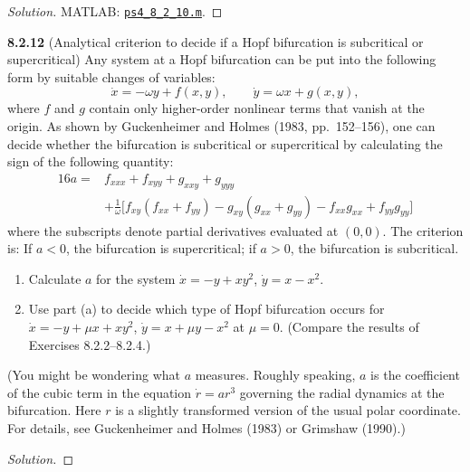\documentclass[10pt]{amsart}
\newenvironment{solution}
{\begin{proof}[Solution]}
{\end{proof}}
\begin{document}
\begin{onehalfspace}
\begin{solution}
\medskip
\noindent MATLAB: \href{https://github.com/chtompki/MathFall2026/blob/main/DynamicalSystems/ProblemSet4/ps4_8_2_10.m}{\nolinkurl{ps4_8_2_10.m}}.

        \end{solution}

        \noindent\textbf{8.2.12}
        (Analytical criterion to decide if a Hopf bifurcation is subcritical or supercritical) Any system at a Hopf bifurcation can be put into the following form by suitable changes of variables:
        \[
            \dot{x}=-\omega y+f(x,y),\qquad
            \dot{y}=\omega x+g(x,y),
        \]
        where $f$ and $g$ contain only higher-order nonlinear terms that vanish at the origin. As shown by Guckenheimer and Holmes (1983, pp.\ 152--156), one can decide whether the bifurcation is subcritical or supercritical by calculating the sign of the following quantity:
        \[
        \begin{aligned}
            16a ={}& f_{xxx}+f_{xyy}+g_{xxy}+g_{yyy}\\
            &+\frac{1}{\omega}\bigl[f_{xy}(f_{xx}+f_{yy})
            -g_{xy}(g_{xx}+g_{yy})-f_{xx}g_{xx}+f_{yy}g_{yy}\bigr]
        \end{aligned}
        \]
        where the subscripts denote partial derivatives evaluated at $(0,0)$. The criterion is: If $a<0$, the bifurcation is supercritical; if $a>0$, the bifurcation is subcritical.
        \begin{enumerate}[label=\alph*)]
            \item Calculate $a$ for the system $\dot{x}=-y+xy^2$, $\dot{y}=x-x^2$.
            \item Use part (a) to decide which type of Hopf bifurcation occurs for $\dot{x}=-y+\mu x+xy^2$, $\dot{y}=x+\mu y-x^2$ at $\mu=0$. (Compare the results of Exercises 8.2.2--8.2.4.)
        \end{enumerate}
        (You might be wondering what $a$ measures. Roughly speaking, $a$ is the coefficient of the cubic term in the equation $\dot{r}=ar^3$ governing the radial dynamics at the bifurcation. Here $r$ is a slightly transformed version of the usual polar coordinate. For details, see Guckenheimer and Holmes (1983) or Grimshaw (1990).)

        \begin{solution}


\end{solution}
\end{onehalfspace}
\end{document}
